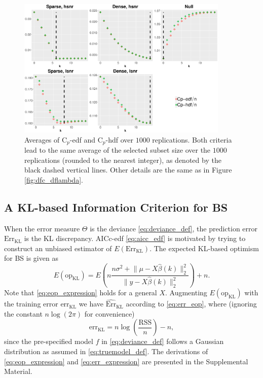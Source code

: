 \begin{figure}[!ht]
	\centering
	\includegraphics[width=0.9\textwidth]{figures/cp_edf_hdf_bs.eps}
	\caption{Averages of C$_p$-edf and C$_p$-hdf over $1000$ replications. Both criteria lead to the same average of the selected subset size over the $1000$ replications (rounded to the nearest integer), as denoted by the black dashed vertical lines. Other details are the same as in Figure \ref{fig:dfc_dflambda}.}
	\label{fig:cp_edf_hdf} 
\end{figure}


\subsection{A KL-based Information Criterion for BS}
When the error measure $\Theta$ is the deviance \eqref{eq:deviance_def}, the prediction error $\text{Err}_\text{KL}$ is the KL discrepancy. AICc-edf \eqref{eq:aicc_edf} is motivated by trying to construct an unbiased estimator of $E(\text{Err}_\text{KL})$. The expected KL-based optimism for BS is given as
\begin{equation}
E(\text{op}_\text{KL}) = E\left(n \frac{n\sigma^2+\lVert \mu-X\hat{\beta}(k) \rVert_2^2}{\lVert y-X\hat{\beta}(k)\rVert_2^2}\right) + n.
\label{eq:eop_expression}
\end{equation}
Note that \eqref{eq:eop_expression} holds for a general $X$. Augmenting $E(\text{op}_\text{KL})$ with the training error $\text{err}_{\text{KL}}$ we have $\widehat{\text{Err}}_{\text{KL}}$ according to \eqref{eq:err_eop}, where (ignoring the constant $n\log(2\pi)$ for convenience)
\begin{equation}
\text{err}_{\text{KL}} = n\log\left(\frac{\text{RSS}}{n}\right) - n,
\label{eq:err_expression}
\end{equation}
since the pre-specified model $f$ in \eqref{eq:deviance_def} follows a Gaussian distribution as assumed in \eqref{eq:truemodel_def}. The derivations of \eqref{eq:eop_expression} and \eqref{eq:err_expression} are presented in the Supplemental Material. 


